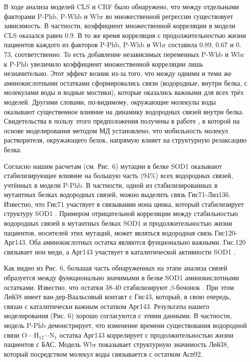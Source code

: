 В ходе анализа моделей CLS и CRF было обнаружено, что между отдельными факторами P-Phb, P-Whb и Wbr во множественной регрессии существовует зависимость. В частности, коэффициент множественной корреляции в модели CLS оказался равен 0.9. В то же время корреляция с продолжительностью жизни пациентов каждого из факторов P-Phb, P-Whb и Wbr составила 0.89, 0.67 и 0. 73, соответственно. То есть добавление независимых переменных P-Whb и Wbr к P-Phb увеличило коэффициент множественной корреляции лишь незначительно. Этот эффект возник из-за того, что между одними и теми же аминокислотными остатками сформировались связи (водородные, внутри белка, с молекулами воды и водные мостики), которые оказались важными для всех трёх моделей. Другими словами, по-видимому, окружающие молекулы воды оказывают существенное влияние на динамику водородных связей внутри белка. Свидетельства в пользу этого предположения получены в работе \cite{Tarek2002}, в которой на основе моделирования методом МД установлено, что мобильность молекул растворителя, окружающего белок, напрямую влияет на структурную релаксацию белка. 

Согласно нашим расчетам (см. Рис. 6) мутации в белке SOD1 оказывают стабилизирующее влияние на большую часть (94\%) всех водородных связей, учтённых в модели P-Phb. В частности, одной из стабилизированных в мутантных белках водородных связей, можно выделить связь Гис71-Лиз136. Известно, что Гис71 участвует в связывании иона цинка, который стабилизирует структуру SOD1 \cite{Arnesano2004,Ding2008}. Примером отрицательной корреляции между стабильностью водородных связей в мутантных белках SOD1 и продолжительностью жизни пациентов, носителей этих мутаций, может являться водородная связь Гис120-Арг143. Оба аминокислотных остатка являются фунционально важными. Гис.120 связывает ион меди, а Арг143 участвует в каталитической активности SOD1 \cite{Muneeswaran2014}.

Как видно из Рис. 6, большая часть обнаруженных на этапе анализа связей образуется между функционально значимыми в белке SOD1 аминокислотными остатками. Известно, что остатки 38-40 стабилизируют $\beta$-бочонок \cite{Deng1995}. При этом Лей38 имеет ван-дер-Ваальсовый контакт с Гис43, который, в свою очередь, связан с каталитически важным остатком Арг143. Результаты нашего моделирования (Рис. 6) хорошо согласуются с этими данными. В частности, модель P-Phb демонстрирует, что изменение времени существования водородной связи $\text{O---}\text{H}_{12}\cdots\text{N}_1$ остатка Арг143 коррелирует с продолжительностью жизни пациентов с БАС. Модель Wbr показывает структурную значимость Лей38, который посредством молекул воды связывается с остатком Асп92.

